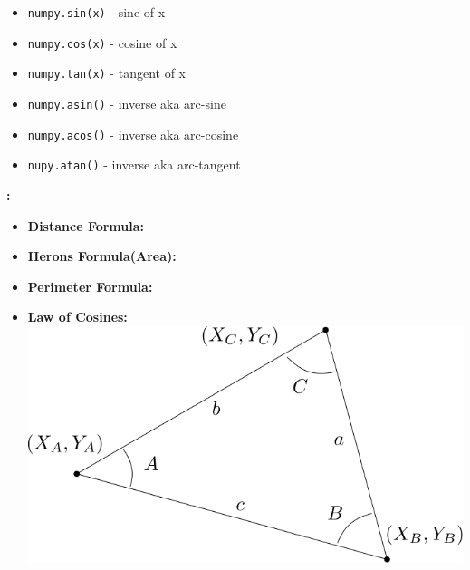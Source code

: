 \documentclass[12pt]{article}
\begin{document}
\begin{description}[labelindent=1cm]
        \begin{itemize}             
            \item \lstinline{numpy.sin(x)} - sine of x
            \item \lstinline{numpy.cos(x)} - cosine of x
            \item \lstinline{numpy.tan(x)} - tangent of x

            \item \lstinline{numpy.asin()} - inverse aka arc-sine  
            \item \lstinline{numpy.acos()} - inverse aka arc-cosine
            \item \lstinline{nupy.atan()} - inverse aka arc-tangent
        \end{itemize}    

        \vspace{20mm}

        \newpage
        \item [\textbf{\underline{Equations}}]\textbf{:} \\
        \begin{itemize}             
            \item {\bf Distance Formula:}  \\

            \item {\bf Herons Formula(Area):}  \vspace{2mm}\\
            \item {\bf Perimeter Formula:}  \vspace{2mm}\\
            \item {\bf Law of Cosines:} \includegraphics[scale=.5]{hw2_fig1.png} \\


\end{itemize}
\end{description}
\end{document}
